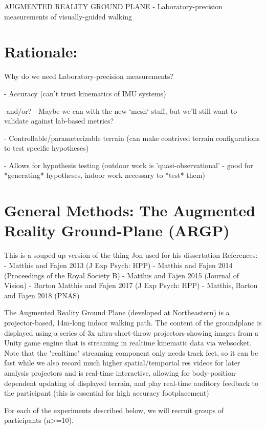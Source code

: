AUGMENTED REALITY GROUND PLANE - Laboratory-precision measurements of
visually-guided walking

\section{Rationale:}

Why do we need Laboratory-precision measurements?

- Accuracy (can't trust kinematics of IMU systems)

    -and/or? - Maybe we can with the new `mesh` stuff, but we'll still want to validate against lab-based metrics?

- Controllable/parameterizable terrain (can make contrived terrain configurations to test specific hypotheses)

- Allows for hypothesis testing (outdoor work is 'quasi-observational' - good for *generating* hypotheses, indoor work necessary to *test* them)


\section{General Methods: The Augmented Reality Ground-Plane (ARGP)}

This is a souped up version of the thing Jon used for his dissertation
References:
  - Matthis and Fajen 2013 (J Exp Psych: HPP)
  - Matthis and Fajen 2014 (Proceedings of the Royal Society B)
  - Matthis and Fajen 2015 (Journal of Vision)
  - Barton Matthis and Fajen 2017 (J Exp Psych: HPP)
  - Matthis, Barton and Fajen 2018 (PNAS)


The Augmented Reality Ground Plane (developed at Northeastern) is a projector-based, 14m-long indoor walking path. The content of the groundplane is displayed using a series of 3x ultra-short-throw projectors showing images from a Unity game engine that is streaming in realtime kinematic data via websocket. Note that the "realtime" streaming component only needs track feet, so it can be fast while we also record much higher spatial/temportal res videos for later analysis projectors and is real-time interactive, allowing for body-position-dependent updating of displayed terrain, and play real-time auditory feedback to the participant (this is essential for high accuracy footplacement)


For each of the experiments described below, we will recruit groups of participants (n\textgreater=10). 

